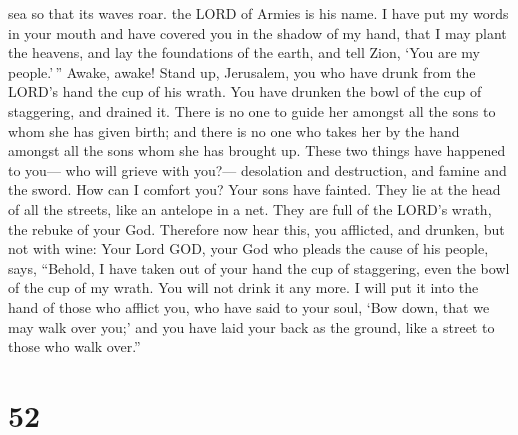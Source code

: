 sea so that its waves roar. the LORD of Armies is his name.
 I have put my words in your mouth and have covered you in
the shadow of my hand, that I may plant the heavens, and lay the
foundations of the earth, and tell Zion, `You are my people.'\,''
 Awake, awake! Stand up, Jerusalem, you who have drunk from
the LORD's hand the cup of his wrath. You have drunken the bowl of the
cup of staggering, and drained it.  There is no one to
guide her amongst all the sons to whom she has given birth; and there is
no one who takes her by the hand amongst all the sons whom she has
brought up.  These two things have happened to you--- who
will grieve with you?--- desolation and destruction, and famine and the
sword. How can I comfort you?  Your sons have fainted. They
lie at the head of all the streets, like an antelope in a net. They are
full of the LORD's wrath, the rebuke of your God. 
Therefore now hear this, you afflicted, and drunken, but not with wine:
 Your Lord GOD, your God who pleads the cause of his
people, says, ``Behold, I have taken out of your hand the cup of
staggering, even the bowl of the cup of my wrath. You will not drink it
any more.  I will put it into the hand of those who afflict
you, who have said to your soul, `Bow down, that we may walk over you;'
and you have laid your back as the ground, like a street to those who
walk over.''

\hypertarget{section-48}{%
\section{52}\label{section-48}}

